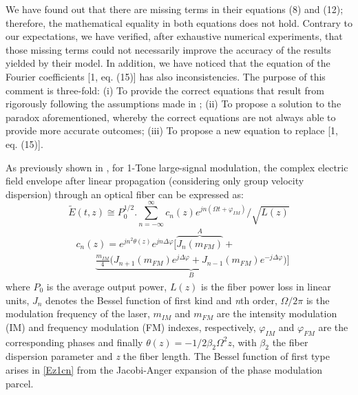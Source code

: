 \documentclass[journal]{IEEEtran}
\begin{document}
We have found out that there are missing terms in their equations (8) and (12); therefore, the mathematical equality in both equations does not hold. Contrary to our expectations, we have verified, after exhaustive numerical experiments, that those missing terms could not necessarily improve the accuracy of the results yielded by their model. In addition, we have noticed that the equation of the Fourier coefficients [1, eq. (15)] has also inconsistencies. The purpose of this comment is three-fold: (i) To provide the correct equations that result from rigorously following the assumptions made in \cite{eva}; (ii) To propose a solution to the paradox aforementioned, whereby the correct equations are not always able to provide more accurate outcomes; (iii) To propose a new equation to replace [1, eq. (15)].

As previously shown in \cite{eva}, for 1-Tone large-signal modulation, the complex electric field envelope after linear propagation (considering only group velocity dispersion) through an optical fiber can be expressed as:
\begin{equation} \label{Ez1}
\tilde{E}(t, z) \cong P_0^{1/2}\bigg.\sum_{n = -\infty}^{\infty} c_n (z)e^{jn(\Omega t + \varphi_{IM})}/\sqrt{L(z)}
\end{equation}
\begin{align} \label{Ez1cn}  \nonumber
&c_n(z) = e^{jn^2\theta(z)}e^{jn\Delta\varphi}\bigg[\overbrace{J_n(m_{FM})}^{A} + \\
& \qquad{} \underbrace{\frac{m_{IM}}{4}\Big(J_{n+1}(m_{FM})e^{j\Delta\varphi} + J_{n-1}(m_{FM})e^{-j\Delta\varphi}\Big)}_{B}\bigg]
\end{align}
where $P_0$  is the average output power, $L(z)$ is the fiber power loss in linear units, $J_n$ denotes the Bessel function of first kind and \emph{n}th order, $\Omega/2\pi$  is the modulation frequency of the laser, $m_{IM}$ and $m_{FM}$  are the intensity modulation (IM) and frequency modulation (FM) indexes, respectively, $\varphi_{IM}$ and $\varphi_{FM}$ are the corresponding phases and finally $\theta(z) = -1/2\beta_2\Omega^2z$, with $\beta_2$ the fiber dispersion parameter and \emph{z} the fiber length. The Bessel function of first type arises in \eqref{Ez1cn} from the Jacobi-Anger expansion of the phase modulation parcel.
\end{document}
